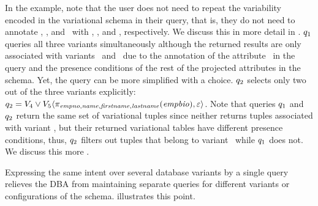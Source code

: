 In the example, note that the user does not need to repeat the variability  encoded
in the variational schema in their query, that is, they do not need to annotate \name,
\fname, and \lname\ with \vFour, \vFive, and \vFive, respectively. We discuss
this in more detail in . $\vQ_1$
queries all three variants simultaneously although the returned results are
only associated with variants \vFour\ and \vFive\ due to the annotation of the
attribute \empno\ in the query and the presence conditions of the rest of the
projected attributes in the schema.
%
Yet, the query can be more simplified with a choice. $\vQ_2$ selects only two
out of the three variants explicitly:
$\vQ_2=\chc[\vFour\vee\vFive]{\pi_{\empno,\name,\fname,\lname}(\empbio),\empRel}$. 
%
Note that queries $\vQ_1$ and $\vQ_2$ return the same set of variational tuples since
neither returns tuples associated with variant \vThree, but their returned
variational tables have different presence conditions, thus, $\vQ_2$ filters out
tuples that belong to variant \vThree\ while $\vQ_1$ does not. We discuss this
more . 
%


 Expressing
the same intent over several database variants by a single query relieves the DBA from
maintaining separate queries for different variants or configurations of the
schema.
illustrates this point.

